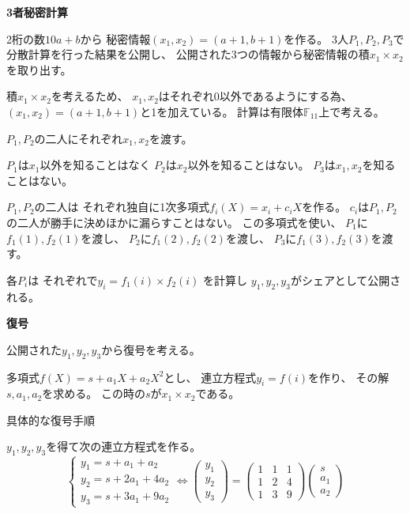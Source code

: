 \documentclass[12pt,b5paper]{ltjsarticle}
\begin{document}
\hrulefill

\textbf{3者秘密計算}

\hrulefill

2桁の数$10a+b$から
秘密情報$(x_1,x_2)=(a+1,b+1)$を作る。
3人$P_1,P_2,P_3$で分散計算を行った結果を公開し、
公開された3つの情報から秘密情報の積$x_1\times x_2$を取り出す。

積$x_1\times x_2$を考えるため、
$x_1,x_2$はそれぞれ$0$以外であるようにする為、
$(x_1,x_2)=(a+1,b+1)$と1を加えている。
計算は有限体$\mathbb{F}_{11}$上で考える。

\dotfill

$P_1,P_2$の二人にそれぞれ$x_1,x_2$を渡す。

$P_1$は$x_1$以外を知ることはなく
$P_2$は$x_2$以外を知ることはない。
$P_3$は$x_1,x_2$を知ることはない。

$P_1,P_2$の二人は
それぞれ独自に1次多項式$f_{i}(X)=x_i + c_i X$を作る。
$c_i$は$P_1,P_2$の二人が勝手に決めほかに漏らすことはない。
この多項式を使い、
$P_1$に$f_1(1),f_2(1)$を渡し、
$P_2$に$f_1(2),f_2(2)$を渡し、
$P_3$に$f_1(3),f_2(3)$を渡す。

各$P_i$は
それぞれで$y_i=f_1(i)\times f_2(i)$
を計算し
$y_1,y_2,y_3$がシェアとして公開される。

\hrulefill

\textbf{復号}

公開された$y_1,y_2,y_3$から復号を考える。

多項式$f(X)=s+a_1 X +a_2 X^2$とし、
連立方程式$y_i=f(i)$を作り、
その解$s,a_1,a_2$を求める。
この時の$s$が$x_1\times x_2$である。

\dotfill

具体的な復号手順

$y_1,y_2,y_3$を得て次の連立方程式を作る。
\begin{equation}
 \begin{cases}
  y_1 = s+a_1  +a_2\\
  y_2 = s+2 a_1 + 4 a_2\\
  y_3 = s+3 a_1 + 9 a_2
 \end{cases}
 \Leftrightarrow
 \begin{pmatrix}
  y_1 \\ y_2 \\ y_3
 \end{pmatrix}
 =
 \begin{pmatrix}
  1 & 1 & 1 \\
  1 & 2 & 4 \\
  1 & 3 & 9
 \end{pmatrix}
 \begin{pmatrix}
  s \\ a_1 \\ a_2
 \end{pmatrix}
\end{equation}
\end{document}
